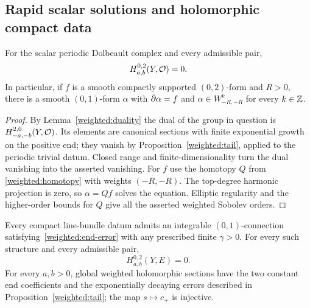 \subsection{Rapid scalar solutions and holomorphic compact data}

\begin{lemma}\label{weighted:scalar-top}
For the scalar periodic Dolbeault complex and every admissible pair,
\[
 H^{0,2}_{a,b}(Y,\mathcal O)=0.
\]
In particular, if $f$ is a smooth compactly supported $(0,2)$-form and
$R>0$, there is a smooth $(0,1)$-form $\alpha$ with
$\bar\partial\alpha=f$ and
$\alpha\in W^k_{-R,-R}$ for every $k\in\mathbb Z$.
\end{lemma}

\begin{proof}
By Lemma~\ref{weighted:duality} the dual of the group in question is
$H^{2,0}_{-a,-b}(Y,\mathcal O)$. Its elements are canonical sections with
finite exponential growth on the positive end; they vanish by
Proposition~\ref{weighted:tail}, applied to the periodic trivial datum.
Closed range and finite-dimensionality turn the dual vanishing into
the asserted vanishing. For $f$ use the homotopy $Q$ from
\eqref{weighted:homotopy} with weights $(-R,-R)$. The top-degree
harmonic projection is zero, so $\alpha=Qf$ solves the equation.
Elliptic regularity and the higher-order bounds for $Q$ give all the
asserted weighted Sobolev orders.
\end{proof}

\begin{proposition}\label{weighted:holomorphic}
Every compact line-bundle datum admits an integrable $(0,1)$-connection
satisfying~\eqref{weighted:end-error} with any prescribed finite
$\gamma>0$. For every such structure and every admissible pair,
\begin{equation}\label{weighted:E-top}
 H^{0,2}_{a,b}(Y,E)=0.
\end{equation}
For every $a,b>0$, global weighted holomorphic
sections have the two constant end coefficients and the exponentially
decaying errors described in Proposition~\ref{weighted:tail}; the map
$s\mapsto c_+$ is injective.
\end{proposition}

